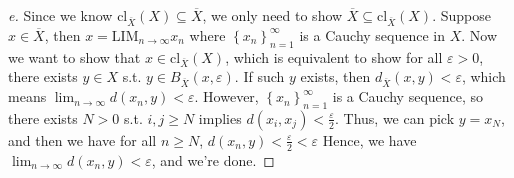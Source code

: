 \begin{proof}[e]
  Since we know \(\mathrm{cl}_{\overline{X}} (X) \subseteq \overline{X} \), we only need to show \(\overline{X} \subseteq \mathrm{cl}_{\overline{X} }(X)  \). Suppose \(x \in \overline{X} \), then \(x = \mathrm{LIM}_{n \to \infty } x_n\) where \(\left\{ x_n \right\}_{n=1}^{\infty}  \) is a Cauchy sequence in \(X\). Now we want to show that \(x \in \mathrm{cl}_{\overline{X} } (X) \), which is equivalent to show for all \(\varepsilon > 0\), there exists \(y \in X\) s.t. \(y \in B_{\overline{X} }(x, \varepsilon )\). If such \(y\) exists, then \(d_{\overline{X} }(x, y)< \varepsilon \), which means \(\lim_{n \to \infty} d(x_n, y) < \varepsilon  \). However, \(\left\{ x_n \right\}_{n=1}^{\infty}  \) is a Cauchy sequence, so there exists \(N > 0\) s.t. \(i, j \ge N\) implies \(d(x_i, x_j) < \frac{\varepsilon}{2}\). Thus, we can pick \(y = x_N\), and then we have for all \(n \ge N\), \(d(x_n, y) < \frac{\varepsilon}{2} < \varepsilon \) Hence, we have \(\lim_{n \to \infty} d(x_n, y) < \varepsilon \), and we're done.              
\end{proof}

